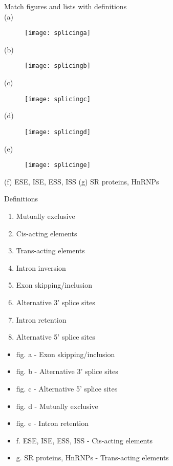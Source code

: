 \begin{Exercise} [
  label={ex44},
  origin={G. Valle}
 ]

\Question Match figures and lists with definitions\\
(a)
\begin{figure}[H]
\texttt{[image: splicinga]}
\end{figure}
(b)
\begin{figure}[H]
\texttt{[image: splicingb]}
\end{figure}
(c)
\begin{figure}[H]
\texttt{[image: splicingc]}
\end{figure}
(d)
\begin{figure}[H]
\texttt{[image: splicingd]}
\end{figure}
(e)
\begin{figure}[H]
\texttt{[image: splicinge]}
\end{figure}
(f) ESE, ISE, ESS, ISS
(g) SR proteins, HnRNPs

Definitions
\begin{enumerate}
\item Mutually exclusive
\item Cis-acting elements
\item Trans-acting elements
\item Intron inversion
\item Exon skipping/inclusion
\item Alternative 3' splice sites
\item Intron retention
\item Alternative 5' splice sites
\end{enumerate}

\end{Exercise}

\begin{Answer} [
  ref={ex44},
  number={1}
 ]

\Question 
\begin{itemize}
\item fig. a - Exon skipping/inclusion
\item fig. b - Alternative 3' splice sites
\item fig. c - Alternative 5' splice sites
\item fig. d - Mutually exclusive
\item fig. e - Intron retention
\item f. ESE, ISE, ESS, ISS - Cis-acting elements
\item g. SR proteins, HnRNPs - Trans-acting elements
\end{itemize}
\end{Answer}